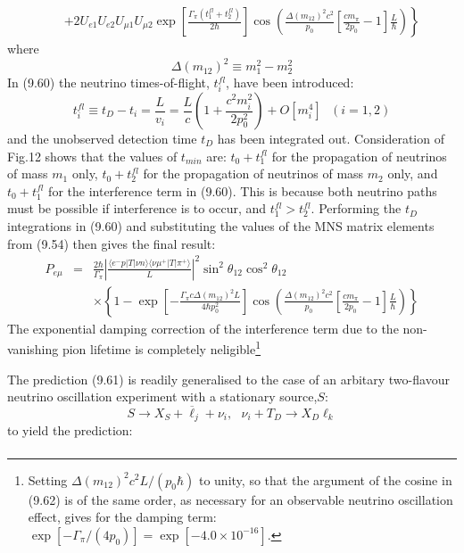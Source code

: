 \documentclass [12pt]{article}
\begin{document}
{\begin{eqnarray}
   &   & \left. +2 U_{e 1}U_{e 2}U_{\mu 1} U_{\mu 2}\exp\left[\frac{\Gamma_{\pi}(t_1^{fl}+t_2^{fl})}{2 \hbar}\right]
        \cos\left(\frac{\Delta(m_{12})^2 c^2}{p_0}\left[\frac{c m_{\pi}}{2 p_0}-1\right]\frac{L}{\hbar}\right) \right\}
   \end{eqnarray}
  where
 \[\Delta(m_{12})^2  \equiv m_1^2-m_2^2  \]
  In (9.60) the neutrino times-of-flight, $t_i^{fl}$, have been introduced:
     \begin{equation}
     t_i^{fl} \equiv t_D-t_i = \frac{L}{v_i}= \frac{L}{c}\left(1+\frac{c^2 m_i^2}{2 p_0^2} \right) + O[m_i^4]~~~(i=1, 2)
     \end{equation}
 and the unobserved detection time $t_D$ has been integrated out.
  Consideration of Fig.12 shows that the values of $t_{min}$ are: $t_0+t_1^{fl}$ for the propagation
  of neutrinos of mass $m_1$ only, $t_0+t_2^{fl}$ for the propagation
  of neutrinos of mass $m_2$ only, and $t_0+t_1^{fl}$ for the interference term in (9.60). This is because
  both neutrino paths must be possible if interference is to occur, and $t_1^{fl}>t_2^{fl}$. Performing the 
   $t_D$ integrations in (9.60) and substituting the values of the MNS matrix elements from (9.54) then
   gives the final result:
      \begin{eqnarray}
       P_{e \mu} & = & \frac{2 \hbar}{\Gamma_{\pi}}\left|\frac{\langle e^-  p |T|\nu n \rangle
        \langle \nu \mu^+ |T|\pi^+ \rangle}{L}\right|^2 \sin^2 \theta_{12} \cos^2 \theta_{12} \nonumber \\
   &  &  \times \left\{ 1- \exp\left[-\frac{\Gamma_{\pi}c \Delta(m_{12})^2 L}{4 \hbar p_0^2}\right]
         \cos\left(\frac{\Delta(m_{12})^2 c^2}{p_0}\left[\frac{c m_{\pi}}{2 p_0}-1\right]\frac{L}{\hbar}\right) \right\}
    \end{eqnarray}
     The exponential damping correction of the interference term due to the non-vanishing pion lifetime
    is completely neligible\footnote{Setting $\Delta(m_{12})^2 c^2 L/(p_0 \hbar)$ to unity, so that the argument
    of the cosine in (9.62) is of the same order, as necessary for an observable neutrino oscillation
    effect, gives for the damping term: $\exp[-\Gamma_{\pi}/(4 p_0)] = \exp[-4.0 \times 10^{-16}]$.}
    \par  The prediction (9.61) is readily generalised to the case of an arbitary two-flavour neutrino oscillation
     experiment with a stationary source,$S$:
    \[    S \rightarrow X_S+ \overline{\ell}_j + \nu_i,~~~ \nu_i+ T_D \rightarrow X_D \ell_k \]
     to yield the prediction:
       \begin{eqnarray}

\end{eqnarray}}
\end{document}
